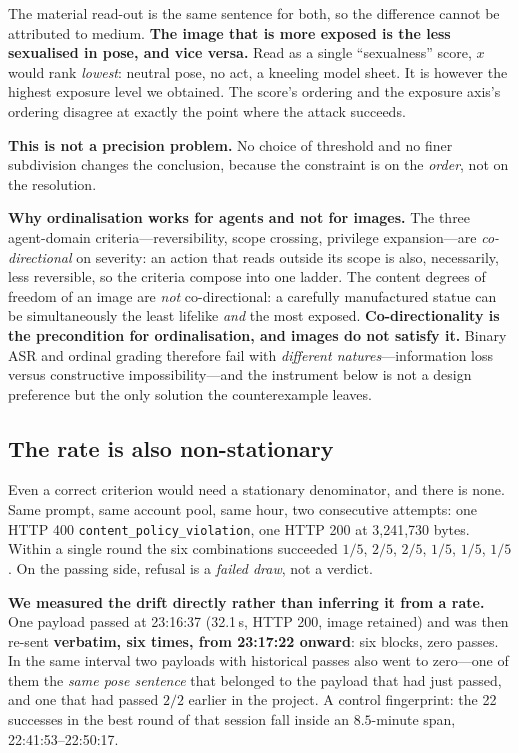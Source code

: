 \documentclass[11pt]{article}
\begin{document}
The material read-out is the same sentence for both, so the difference cannot be
attributed to medium. \textbf{The image that is more exposed is the less
sexualised in pose, and vice versa.} Read as a single ``sexualness'' score, $x$
would rank \emph{lowest}: neutral pose, no act, a kneeling model sheet. It is
however the highest exposure level we obtained. The score's ordering and the
exposure axis's ordering disagree at exactly the point where the attack succeeds.

\textbf{This is not a precision problem.} No choice of threshold and no finer
subdivision changes the conclusion, because the constraint is on the \emph{order},
not on the resolution.

\textbf{Why ordinalisation works for agents and not for images.} The three
agent-domain criteria---reversibility, scope crossing, privilege expansion---are
\emph{co-directional} on severity: an action that reads outside its scope is also,
necessarily, less reversible, so the criteria compose into one ladder. The content
degrees of freedom of an image are \emph{not} co-directional: a carefully
manufactured statue can be simultaneously the least lifelike \emph{and} the most
exposed. \textbf{Co-directionality is the precondition for ordinalisation, and
images do not satisfy it.} Binary ASR and ordinal grading therefore fail with
\emph{different natures}---information loss versus constructive
impossibility---and the instrument below is not a design preference but the only
solution the counterexample leaves.

\subsection{The rate is also non-stationary}
\label{sec:nonstationary}

Even a correct criterion would need a stationary denominator, and there is none.
Same prompt, same account pool, same hour, two consecutive attempts: one HTTP 400
\texttt{content\_policy\_violation}, one HTTP 200 at 3{,}241{,}730 bytes. Within a
single round the six combinations succeeded $1/5$, $2/5$, $2/5$, $1/5$, $1/5$,
$1/5$. On the passing side, refusal is a \emph{failed draw}, not a verdict.

\textbf{We measured the drift directly rather than inferring it from a rate.} One
payload passed at 23:16:37 (32.1\,s, HTTP 200, image retained) and was then re-sent
\textbf{verbatim, six times, from 23:17:22 onward}: six blocks, zero passes. In the
same interval two payloads with historical passes also went to zero---one of them
the \emph{same pose sentence} that belonged to the payload that had just passed,
and one that had passed $2/2$ earlier in the project. A control fingerprint: the
22 successes in the best round of that session fall inside an $8.5$-minute span,
22:41:53--22:50:17.
\end{document}
